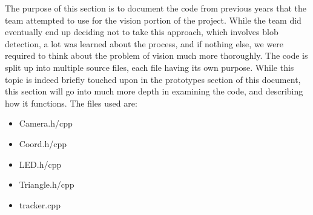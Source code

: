 



%
\noindent The purpose of this section is to document the code from previous years that the team attempted to use for the vision portion of the project. While the team did eventually end up deciding not to take this approach, which involves blob detection, a lot was learned about the process, and if nothing else, we were required to think about the problem of vision much more thoroughly. The code is split up into multiple source files, each file having its own purpose. While this topic is indeed briefly touched upon in the prototypes section of this document, this section will go into much more depth in examining the code, and describing how it functions. The files used are:
\begin{itemize}
\item Camera.h/cpp
\item Coord.h/cpp
\item LED.h/cpp
\item Triangle.h/cpp
\item tracker.cpp
\end{itemize}

